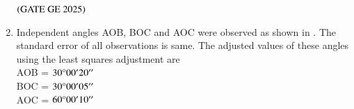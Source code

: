 \documentclass[journal,12pt,onecolumn]{IEEEtran}
\theoremstyle{remark}
\begin{document}
\begin{enumerate}
\begin{enumerate}
\end{enumerate}
\hfill $\left(\text{GATE GE 2025}\right)$
\bigskip
\item Independent angles AOB, BOC and AOC were observed as shown in .
The standard error of all observations is same. The adjusted values of these angles using the least squares adjustment are\\
AOB = $30\degree00'20''$\\
BOC = $30\degree00'05''$\\
AOC = $60\degree00'10''$\\


\end{enumerate}
\end{document}
